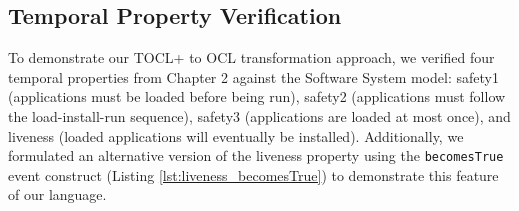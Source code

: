 



\subsection{Temporal Property Verification}


\hspace{1cm} To demonstrate our TOCL+ to OCL transformation approach, we verified four temporal 
properties from Chapter 2 against the Software System model: safety1 (applications 
must be loaded before being run), safety2 (applications must follow the 
load-install-run sequence), safety3 (applications are loaded at most once), and 
liveness (loaded applications will eventually be installed). Additionally, we 
formulated an alternative version of the liveness property using the 
\texttt{becomesTrue} event construct (Listing \ref{lst:liveness_becomesTrue}) to 
demonstrate this feature of our language. 

